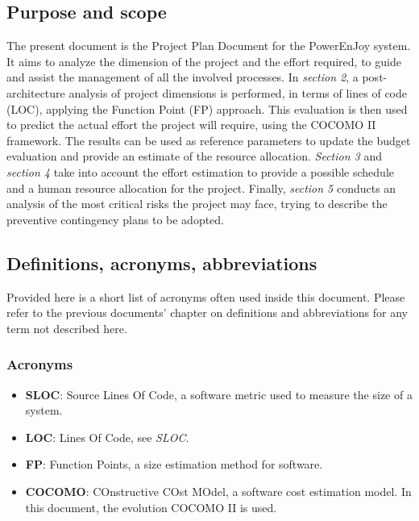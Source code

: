 \subsection{Purpose and scope}
	The present document is the Project Plan Document for the PowerEnJoy system. It aims to analyze the dimension of the project and the effort required, to guide and assist the management of all the involved processes. \newline
	In \textit{section 2}, a post-architecture analysis of project dimensions is performed, in terms of lines of code (LOC), applying the Function Point (FP) approach. This evaluation is then used to predict the actual effort the project will require, using the COCOMO II framework. The results can be used as reference parameters to update the budget evaluation and provide an estimate of the resource allocation.\newline
	\textit{Section 3} and \textit{section 4} take into account the effort estimation to provide a possible schedule and a human resource allocation for the project.\newline
	Finally, \textit{section 5} conducts an analysis of the most critical risks the project may face, trying to describe the preventive contingency plans to be adopted.

\subsection{Definitions, acronyms, abbreviations}
	Provided here is a short list of acronyms often used inside this document. Please refer to the previous documents’ chapter on definitions and abbreviations for any term not described here.

	\subsubsection{Acronyms}
		\begin{itemize}
			\item \textbf{SLOC}: Source Lines Of Code, a software metric used to measure the size of a system.
			\item \textbf{LOC}: Lines Of Code, see \textit{SLOC}.
			\item \textbf{FP}: Function Points, a size estimation method for software.
			\item \textbf{COCOMO}: COnstructive COst MOdel, a software cost estimation model. In this document, the evolution COCOMO II is used.
		\end{itemize}

